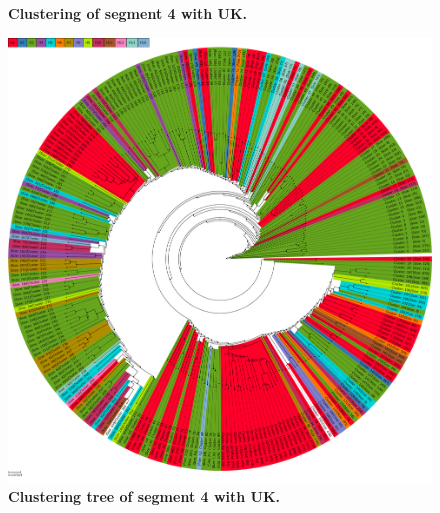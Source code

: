 \begin{figure}[!hbt]
\begin{subfigure}[b]{0.475\textwidth}
    \end{subfigure}
    \caption[Clustering of segment 4 with UK]{\textbf{Clustering of segment 4 with UK.} }
    \label{fig:UMAP_Cluster_Knee_4}
\end{figure}

\FloatBarrier
\newpage

\begin{figure}[!hbt]
    \centering
    \includegraphics[width=\textwidth]{UMAP/Clustertree_Segment_4_H_Knee.pdf}
    \caption[Clustering tree of segment 4 with UK]{\textbf{Clustering tree of segment 4 with UK.} }
    \label{fig:UMAP_Clusteree_Knee_4}
\end{figure}

